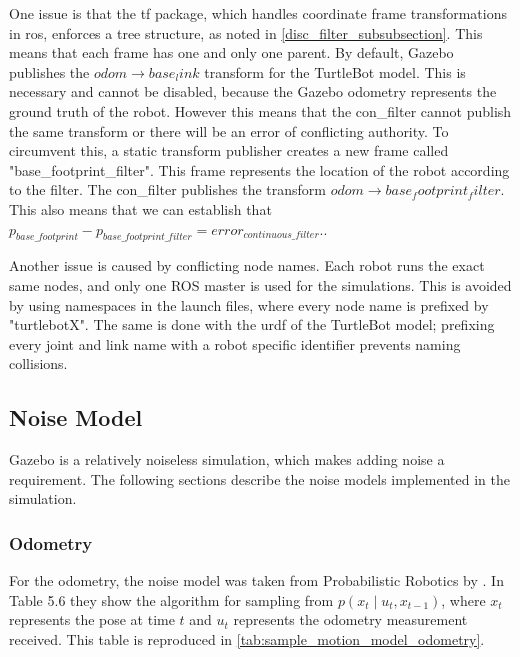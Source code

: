 \documentclass[thesis.tex]{subfile}
\begin{document}
One issue is that the tf package, which handles coordinate frame transformations in \gls{ros}, enforces a tree structure, as noted in \autoref{disc_filter_subsubsection}. This means that each frame has one and only one parent. By default, Gazebo publishes the $odom \rightarrow base_link$ transform for the TurtleBot model. This is necessary and cannot be disabled, because the Gazebo odometry represents the ground truth of the robot. However this means that the \gls{con_filter} cannot publish the same transform or there will be an error of conflicting authority. To circumvent this, a static transform publisher creates a new frame called "base\_footprint\_filter". This frame represents the location of the robot according to the filter. The \gls{con_filter} publishes the transform $odom \rightarrow base_footprint_filter$. This also means that we can establish that $p_{base\_footprint} - p_{base\_footprint\_filter} = error_{continuous\_filter}$..

Another issue is caused by conflicting node names. Each robot runs the exact same nodes, and only one ROS master is used for the simulations. This is avoided by using namespaces in the launch files, where every node name is prefixed by "turtlebotX". The same is done with the \gls{urdf} of the TurtleBot model; prefixing every joint and link name with a robot specific identifier prevents naming collisions.

\subsection{Noise Model} \label{sec:noise_model}
Gazebo is a relatively noiseless simulation, which makes adding noise a requirement. The following sections describe the noise models implemented in the simulation.

\subsubsection{Odometry}
For the odometry, the noise model was taken from Probabilistic Robotics by \textcite[136]{ProbabilisticRobotics}. In Table 5.6 they show the algorithm for sampling from $p(x_t \mid u_t, x_{t-1})$, where $x_t$ represents the pose at time $t$ and $u_t$ represents the odometry measurement received. This table is reproduced in \autoref{tab:sample_motion_model_odometry}.
\end{document}
